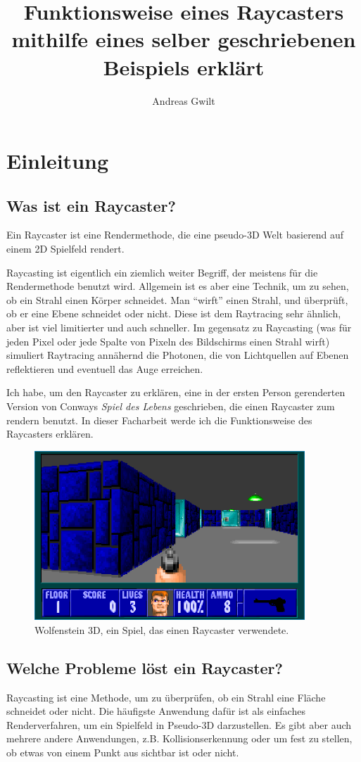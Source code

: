 \documentclass[a4paper,12pt]{report}
\title{Funktionsweise eines Raycasters mithilfe eines selber geschriebenen Beispiels erkl\"art}
\author{Andreas Gwilt}
\newcommand{\mychapter}[2]{
    \setcounter{chapter}{#1}
    \setcounter{section}{0}
    \chapter*{#2}
    \addcontentsline{toc}{chapter}{#2}
}
\begin{document}
\maketitle
\tableofcontents

\mychapter{1}{Einleitung}

\section{Was ist ein Raycaster?}
Ein Raycaster ist eine Rendermethode, die eine pseudo-3D Welt basierend auf einem 2D Spielfeld rendert\cite{scratch}. 

Raycasting ist eigentlich ein ziemlich weiter Begriff, der meistens für die Rendermethode benutzt wird. Allgemein ist es aber eine Technik, um zu sehen, ob ein Strahl einen Körper schneidet. Man ``wirft'' einen Strahl, und überprüft, ob er eine Ebene schneidet oder nicht. Diese ist dem Raytracing sehr ähnlich, aber ist viel limitierter und auch schneller. Im gegensatz zu Raycasting (was für jeden Pixel oder jede Spalte von Pixeln des Bildschirms einen Strahl wirft) simuliert Raytracing annähernd die Photonen, die von Lichtquellen auf Ebenen reflektieren und eventuell das Auge erreichen.

Ich habe, um den Raycaster zu erklären, eine in der ersten Person gerenderten Version von Conways \textit{Spiel des Lebens}\cite{life} geschrieben, die einen Raycaster zum rendern benutzt. In dieser Facharbeit werde ich die Funktionsweise des Raycasters erklären.

\begin{figure}[htbp] 
        \centering
        \includegraphics[width=4in]{wolf3d.png} 
        \caption{Wolfenstein 3D, ein Spiel, das einen Raycaster verwendete.}
        \label{fig:wolf3d}
\end{figure}

\section{Welche Probleme löst ein Raycaster?}
Raycasting ist eine Methode, um zu überprüfen, ob ein Strahl eine Fläche schneidet oder nicht. Die häufigste Anwendung dafür ist als einfaches Renderverfahren, um ein Spielfeld in Pseudo-3D darzustellen. Es gibt aber auch mehrere andere Anwendungen, z.B. Kollisionserkennung oder um fest zu stellen, ob etwas von einem Punkt aus sichtbar ist oder nicht.
\end{document}
